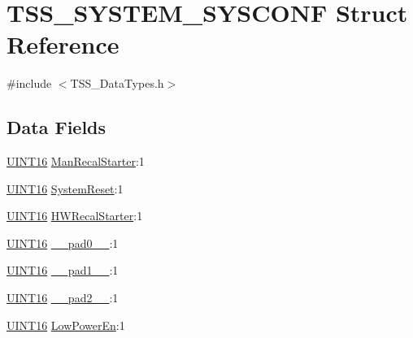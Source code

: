 \hypertarget{struct_t_s_s___s_y_s_t_e_m___s_y_s_c_o_n_f}{}\section{T\+S\+S\+\_\+\+S\+Y\+S\+T\+E\+M\+\_\+\+S\+Y\+S\+C\+O\+NF Struct Reference}
\label{struct_t_s_s___s_y_s_t_e_m___s_y_s_c_o_n_f}


{\ttfamily \#include $<$T\+S\+S\+\_\+\+Data\+Types.\+h$>$}

\subsection*{Data Fields}
\begin{DoxyCompactItemize}
\item 
\hyperlink{_t_s_s___data_types_8h_a09f1a1fb2293e33483cc8d44aefb1eb1}{U\+I\+N\+T16} \hyperlink{struct_t_s_s___s_y_s_t_e_m___s_y_s_c_o_n_f_ac84b71e2d8372abe71a969fe7927776a}{Man\+Recal\+Starter}\+:1
\item 
\hyperlink{_t_s_s___data_types_8h_a09f1a1fb2293e33483cc8d44aefb1eb1}{U\+I\+N\+T16} \hyperlink{struct_t_s_s___s_y_s_t_e_m___s_y_s_c_o_n_f_a963b592f2ef018dd20bd0c51d0460f44}{System\+Reset}\+:1
\item 
\hyperlink{_t_s_s___data_types_8h_a09f1a1fb2293e33483cc8d44aefb1eb1}{U\+I\+N\+T16} \hyperlink{struct_t_s_s___s_y_s_t_e_m___s_y_s_c_o_n_f_aa52cd087a064367696dc08fd56fc57e0}{H\+W\+Recal\+Starter}\+:1
\item 
\hyperlink{_t_s_s___data_types_8h_a09f1a1fb2293e33483cc8d44aefb1eb1}{U\+I\+N\+T16} \hyperlink{struct_t_s_s___s_y_s_t_e_m___s_y_s_c_o_n_f_adebd46da19f21994c8a57784f4420389}{\+\_\+\+\_\+pad0\+\_\+\+\_\+}\+:1
\item 
\hyperlink{_t_s_s___data_types_8h_a09f1a1fb2293e33483cc8d44aefb1eb1}{U\+I\+N\+T16} \hyperlink{struct_t_s_s___s_y_s_t_e_m___s_y_s_c_o_n_f_a36b121c0e63f77178401a6c594c33765}{\+\_\+\+\_\+pad1\+\_\+\+\_\+}\+:1
\item 
\hyperlink{_t_s_s___data_types_8h_a09f1a1fb2293e33483cc8d44aefb1eb1}{U\+I\+N\+T16} \hyperlink{struct_t_s_s___s_y_s_t_e_m___s_y_s_c_o_n_f_a88ac20ac81c55f3ca20071b5f4f6be4b}{\+\_\+\+\_\+pad2\+\_\+\+\_\+}\+:1
\item 
\hyperlink{_t_s_s___data_types_8h_a09f1a1fb2293e33483cc8d44aefb1eb1}{U\+I\+N\+T16} \hyperlink{struct_t_s_s___s_y_s_t_e_m___s_y_s_c_o_n_f_a21d43367f30eb3e0af598813f2b64728}{Low\+Power\+En}\+:1
\item 

\end{DoxyCompactItemize}
